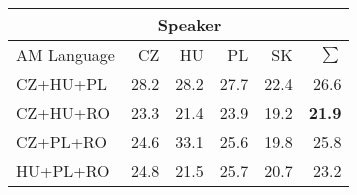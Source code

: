 \begin{tabular}{l|rrrr|r}
\hline
& \multicolumn{3}{c}{Speaker} & \\
\hline
 AM Language   &   CZ &   HU &   PL &   SK &   $\sum$ \\
\hline
 CZ+HU+PL      & 28.2 & 28.2 & 27.7 & 22.4 &     26.6 \\
CZ+HU+RO      & 23.3 & 21.4 & 23.9 & 19.2 &     \bf{21.9} \\
 CZ+PL+RO      & 24.6 & 33.1 & 25.6 & 19.8 &     25.8 \\
 HU+PL+RO      & 24.8 & 21.5 & 25.7 & 20.7 &     23.2 \\
\hline
\end{tabular}
